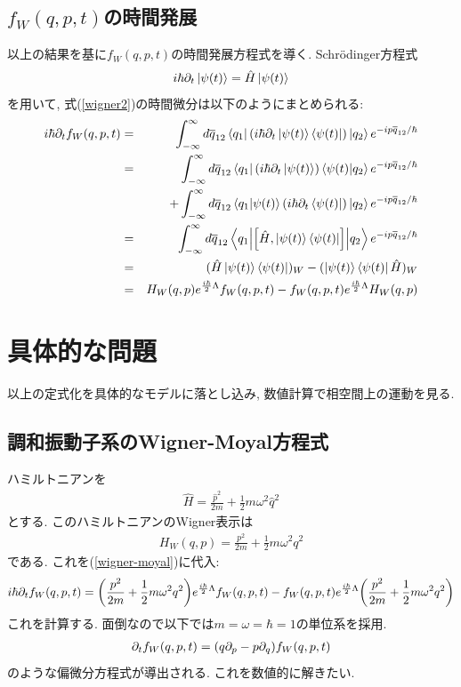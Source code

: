 \documentclass[10.5pt,a4paper]{jsarticle}
\begin{document}
\subsection{$f_W(q, p, t)$の時間発展}
以上の結果を基に$f_W(q, p, t)$の時間発展方程式を導く. Schr\"odinger方程式
\begin{eqnarray}
  i\hbar\partial_t\ket{\psi(t)} = \hat{H}\ket{\psi(t)}
\end{eqnarray}
を用いて, 式(\ref{wigner2})の時間微分は以下のようにまとめられる:
\begin{eqnarray}
  i\hbar\partial_tf_W(q, p, t) &=& \int_{-\infty}^{\infty} d\overline{q}_{12} \bra{q_1}\qty(i\hbar\partial_t\ket{\psi(t)}\bra{\psi(t)})\ket{q_2}e^{-ip\overline{q}_{12}/\hbar}\\
  \nonumber  &=& \int_{-\infty}^{\infty} d\overline{q}_{12} \bra{q_1}(i\hbar\partial_t\ket{\psi(t)})\bra{\psi(t)}\ket{q_2}e^{-ip\overline{q}_{12}/\hbar}\\
  &&\hspace{0.5cm} + \int_{-\infty}^{\infty} d\overline{q}_{12} \bra{q_1}\ket{\psi(t)}(i\hbar\partial_t\bra{\psi(t)})\ket{q_2}e^{-ip\overline{q}_{12}/\hbar}\\
  &=& \int_{-\infty}^{\infty} d\overline{q}_{12} \mel**{q_1}{\comm{\hat{H}}{\ket{\psi(t)}\bra{\psi(t)}}}{q_2}e^{-ip\overline{q}_{12}/\hbar}\\
  &=& (\hat{H}\ket{\psi(t)}\bra{\psi(t)})_W - (\ket{\psi(t)}\bra{\psi(t)}\hat{H})_W\\
  &=& H_W(q, p)e^{\frac{i\hbar}{2}\Lambda}f_W(q, p, t) - f_W(q, p, t)e^{\frac{i\hbar}{2}\Lambda}H_W(q, p)\label{wigner-moyal}
\end{eqnarray}
\section{具体的な問題}
以上の定式化を具体的なモデルに落とし込み, 数値計算で相空間上の運動を見る.
\subsection{調和振動子系のWigner-Moyal方程式}
ハミルトニアンを
\begin{eqnarray}
  \hat{H} = \frac{\hat{p}^2}{2m} + \frac{1}{2}m\omega^2\hat{q}^2
\end{eqnarray}
とする. このハミルトニアンのWigner表示は
\begin{eqnarray}
  H_W(q, p) = \frac{p^2}{2m} + \frac{1}{2}m\omega^2q^2
\end{eqnarray}
である. これを(\ref{wigner-moyal})に代入:
\begin{eqnarray}
  i\hbar\partial_tf_W(q, p, t) = \qty(\frac{p^2}{2m} + \frac{1}{2}m\omega^2q^2)e^{\frac{i\hbar}{2}\Lambda}f_W(q, p, t) - f_W(q, p, t)e^{\frac{i\hbar}{2}\Lambda}\qty(\frac{p^2}{2m} + \frac{1}{2}m\omega^2q^2)
\end{eqnarray}
これを計算する. 面倒なので以下では$m = \omega = \hbar = 1$の単位系を採用.  
\begin{eqnarray}
  \partial_t f_W(q, p, t) = \qty(q\partial_p - p\partial_q)f_W(q, p, t)\label{wigner-moyal2}
\end{eqnarray}
のような偏微分方程式が導出される. これを数値的に解きたい.
\end{document}
